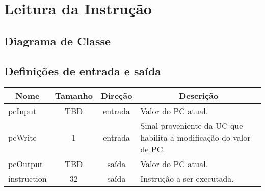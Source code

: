 \section{Leitura da Instrução}
	\subsection{Diagrama de Classe}
		\begin{center}
		\end{center}
		
		\subsection{Definições de entrada e saída}
		
	\begin{center}
		\begin{longtable}[pos]{| l | c | c | m{7cm} |} \hline
			\multicolumn{1}{|c|}{\cellcolor[gray]{0.9}\textbf{Nome}} & 
			\multicolumn{1}{c|}{\cellcolor[gray]{0.9}\textbf{Tamanho}} & 
			\multicolumn{1}{c|}{\cellcolor[gray]{0.9}\textbf{Direção}} &
			\multicolumn{1}{c|}{\cellcolor[gray]{0.9}\textbf{Descrição}} \\ \hline
			\endhead
			\hline
			\endlastfoot
			
			pcInput & TBD & entrada & Valor do PC atual.\\ \hline
			pcWrite & 1 & entrada & Sinal proveniente da UC que habilita a modificação do valor de PC. \\ \hline
			pcOutput & TBD & saída & Valor do PC atual. \\ \hline
			instruction & 32 & saída & Instrução a ser executada. \\ \hline
			
		\end{longtable}
	\end{center}